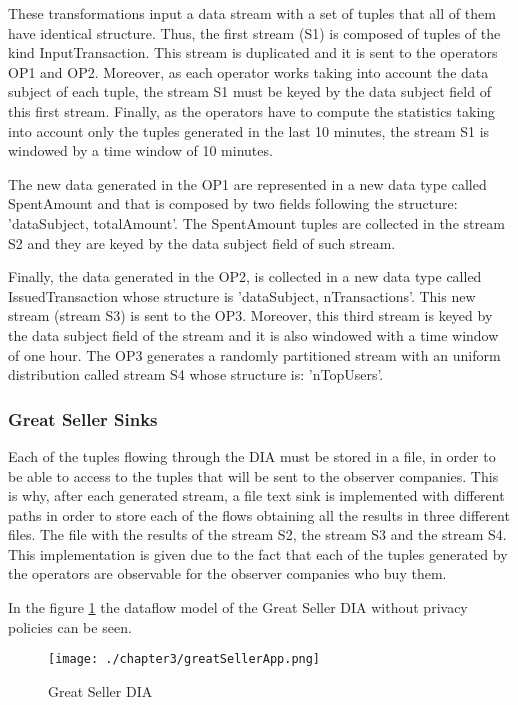 These transformations input a data stream with a set of tuples that all of them have identical structure. Thus, the first stream (S1) is composed of tuples of the kind InputTransaction. This stream is duplicated and it is sent to the operators OP1 and OP2. Moreover, as each operator works taking into account the data subject of each tuple, the stream S1 must be keyed by the data subject field of this first stream. Finally, as the operators have to compute the statistics taking into account only the tuples generated in the last 10 minutes, the stream S1 is windowed by a time window of 10 minutes.

The new data generated in the OP1 are represented in a new data type called SpentAmount and that is composed by two fields following the structure: 'dataSubject, totalAmount'. The SpentAmount tuples are collected in the stream S2 and they are keyed by the data subject field of such stream.

Finally, the data generated in the OP2, is collected in a new data type called IssuedTransaction whose structure is 'dataSubject, nTransactions'. This new stream (stream S3) is sent to the OP3. Moreover, this third stream is keyed by the data subject field of the stream and it is also windowed with a time window of one hour. The OP3 generates a randomly partitioned stream with an uniform distribution called stream S4 whose structure is: 'nTopUsers'.

\subsubsection{Great Seller Sinks}
Each of the tuples flowing through the DIA must be stored in a file, in order to be able to access to the tuples that will be sent to the observer companies. This is why, after each generated stream, a file text sink is implemented with different paths in order to store each of the flows obtaining all the results in three different files. The file with the results of the stream S2, the stream S3 and the stream S4.
This implementation is given due to the fact that each of the tuples generated by the operators are observable for the observer companies who buy them.


In the figure \ref{fig:Great Seller DIA} the dataflow model of the Great Seller DIA without privacy policies can be seen.

\begin{figure}
\centering
{\texttt{[image: ./chapter3/greatSellerApp.png]}}
\caption{Great Seller DIA}
\label{fig:Great Seller DIA}
\end{figure}
















